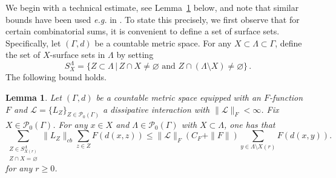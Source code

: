 \documentclass{article}
\newcommand{\<}{\langle}
\renewcommand{\>}{\rangle}
\let\emptyset\varnothing
\numberwithin{equation}{section}
\newtheorem{lem}[thm]{Lemma}
\theoremstyle{definition}
\begin{document}
We begin with a technical estimate, see Lemma~\ref{lem:NOS} below, and note that similar bounds have been used \textit{e.g.} in \cite{NachtergaeleOgataSims}. 
To state this precisely, we first observe that for certain combinatorial sums, it is convenient to define 
a set of surface sets. Specifically, let $(\Gamma, d)$ be a countable metric space. 
For any $X \subset \Lambda \subset \Gamma$, define the set of $X$-surface sets in $\Lambda$ by setting
\begin{equation}
S_X^{\Lambda} = \{ Z \subset \Lambda \, | \, Z \cap X \neq \emptyset \mbox{ and } Z \cap ( \Lambda \setminus X) \neq \emptyset \} \, .
\end{equation}
The following bound holds.  
\begin{lem}\label{lem:NOS}
Let $(\Gamma, d)$ be a countable metric space equipped with an $F$-function $F$ and $\mathscr{L}= \{ L_Z \}_{Z\in \mathcal{P}_0(\Gamma)}$ a dissipative interaction with $\| \mathscr{L} \|_F< \infty$. Fix $X \in \mathcal{P}_0(\Gamma)$. For any $x \in X$ and $\Lambda \in \mathcal{P}_0(\Gamma)$ with $X \subset \Lambda$, one has that 
\begin{equation}\label{base_est_1}
\sum_{\substack{Z\in S_{X(r)}^\Lambda\\ Z\cap X = \emptyset}} \|L_Z\|_{cb} \sum_{z\in Z} F(d(x,z)) \le \| \mathscr{L}\|_{F}(C_{F} + \|F\|) \sum_{y\in \Lambda\setminus X(r)} F(d(x,y)).
\end{equation}
for any $r \geq 0$. 
\end{lem}
\end{document}
